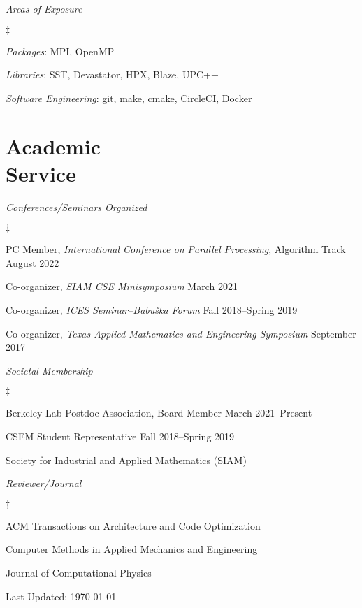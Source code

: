 \documentclass[margin,line]{res}
\newenvironment{list2}{
  \begin{list}{$\ddagger$}{%
      \setlength{\itemsep}{0in}
      \setlength{\parsep}{0in} \setlength{\parskip}{0in}
      \setlength{\topsep}{0in} \setlength{\partopsep}{0in}
      \setlength{\leftmargin}{0.2in}}}{\end{list}}
\begin{document}
\begin{resume}
\textit{Areas of Exposure}
\vspace{0.05in}
\begin{list2}
\item {\em Packages}: MPI, OpenMP
\item {\em Libraries}: SST, Devastator, HPX, Blaze, UPC++
\item {\em Software Engineering}: git, make, cmake, CircleCI, Docker
\end{list2}

\section{\sc Academic \\ Service}

\textit{Conferences/Seminars Organized}
\vspace{0.05in}
\begin{list2}
\item PC Member, {\em International Conference on Parallel Processing}, Algorithm Track \hfill August 2022
\item Co-organizer, {\em SIAM CSE Minisymposium} \hfill March 2021
\item Co-organizer, {\em ICES Seminar--Babu\v{s}ka Forum} \hfill Fall 2018--Spring 2019
\item Co-organizer, {\em Texas Applied Mathematics and Engineering Symposium} \hfill September 2017
\end{list2}

\textit{Societal Membership}
\vspace{0.05in}
\begin{list2}
\item Berkeley Lab Postdoc Association, Board Member \hfill March 2021--Present
\item CSEM Student Representative \hfill Fall 2018--Spring 2019
\item Society for Industrial and Applied Mathematics (SIAM)
\end{list2}

\textit{Reviewer/Journal}
\vspace{0.05in}
\begin{list2}
\item ACM Transactions on Architecture and Code Optimization
\item Computer Methods in Applied Mechanics and Engineering
\item Journal of Computational Physics
\end{list2}
\end{resume}
\vfill
\centerline{Last Updated: \today}
\end{document}

